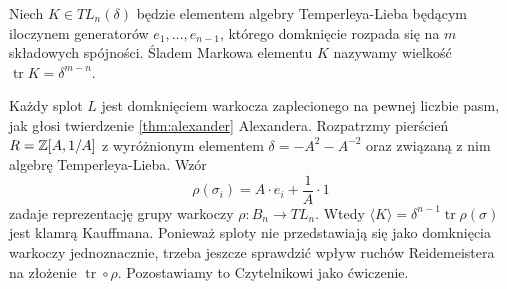 \begin{comment}
            \strand[semithick] (-3, -2) to (3, -2);
            \strand[semithick] (-3, 0) [in=down, out=right] to (-1, 1) [in=right, out=up] to (-3, 2);
            \strand[semithick] (3, 0) [in=down, out=left] to (1, 1) [in=left, out=up] to (3, 2);
            \strand[semithick] (-3, +4) to (3, +4);
            \node[darkblue] at (0, -6) {$e_3$};
    \end{knot}
    \end{tikzpicture}
    \begin{tikzpicture}[baseline=-0.65ex, scale=0.2]
        \useasboundingbox (-6, -5) rectangle (6, 4);
        \begin{knot}[clip width=5, end tolerance=1pt]
            \strand[semithick] (-3, -4) to (3, -4);
            \strand[semithick] (-3, -2) to (3, -2);
            \strand[semithick] (-3, -0) to (3, +0);
            \strand[semithick] (-3, 2) [in=down, out=right] to (-1, 3) [in=right, out=up] to (-3, 4);
            \strand[semithick] (3, 2) [in=down, out=left] to (1, 3) [in=left, out=up] to (3, 4);
            \node[darkblue] at (0, -6) {$e_4$};
    \end{knot}
    \end{tikzpicture}
\]
\caption{Diagramatyczne przedstawienie elementów bazowych algebry $TL_5(\delta)$}
\end{figure}
\end{comment}

\begin{definition}
    Niech $K \in TL_n(\delta)$ będzie elementem algebry Temperleya-Lieba będącym iloczynem generatorów $e_1, \ldots, e_{n-1}$, którego domknięcie rozpada się na $m$ składowych spójności.
    Śladem Markowa elementu $K$ nazywamy wielkość $\operatorname{tr} K = \delta^{m-n}$.
\end{definition}

Każdy splot $L$ jest domknięciem warkocza zaplecionego na pewnej liczbie pasm, jak głosi twierdzenie \ref{thm:alexander} Alexandera.
Rozpatrzmy pierścień $R = \mathbb Z[A, 1/A]$ z wyróżnionym elementem $\delta = -A^2 - A^{-2}$ oraz związaną z nim algebrę Temperleya-Lieba.
Wzór
\begin{equation}
    \rho(\sigma_i) = A \cdot e_i + \frac{1}{A} \cdot 1
\end{equation}
zadaje reprezentację grupy warkoczy $\rho \colon B_n \to TL_n$.
Wtedy $\langle K \rangle = \delta^{n-1} \operatorname{tr} \rho (\sigma)$ jest klamrą Kauffmana.
Ponieważ sploty nie przedstawiają się jako domknięcia warkoczy jednoznacznie, trzeba jeszcze sprawdzić wpływ ruchów Reidemeistera na złożenie $\operatorname{tr} \circ \rho$.
Pozostawiamy to Czytelnikowi jako ćwiczenie.

